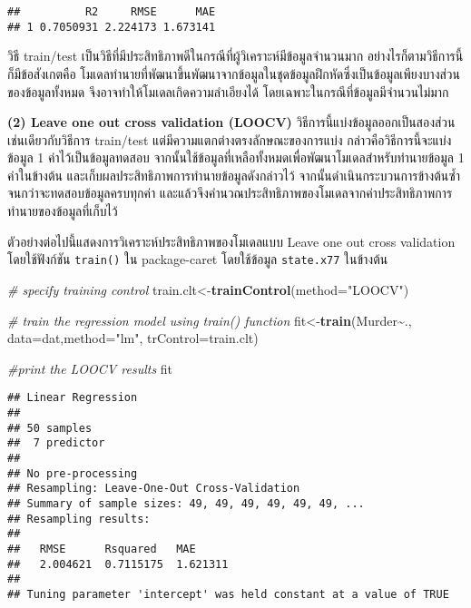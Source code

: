 \documentclass[
]{article}
\newenvironment{Shaded}{\begin{snugshade}}{\end{snugshade}}
\newcommand{\CommentTok}[1]{\textcolor[rgb]{0.56,0.35,0.01}{\textit{#1}}}
\newcommand{\DataTypeTok}[1]{\textcolor[rgb]{0.13,0.29,0.53}{#1}}
\newcommand{\KeywordTok}[1]{\textcolor[rgb]{0.13,0.29,0.53}{\textbf{#1}}}
\newcommand{\NormalTok}[1]{#1}
\newcommand{\OperatorTok}[1]{\textcolor[rgb]{0.81,0.36,0.00}{\textbf{#1}}}
\newcommand{\StringTok}[1]{\textcolor[rgb]{0.31,0.60,0.02}{#1}}
\begin{document}
\begin{verbatim}
##          R2     RMSE      MAE
## 1 0.7050931 2.224173 1.673141
\end{verbatim}

วิธี train/test
เป็นวิธีที่มีประสิทธิภาพดีในกรณีที่ผู้วิเคราะห์มีข้อมูลจำนวนมาก
อย่างไรก็ตามวิธีการนี้ก็มีข้อสังเกตคือ
โมเดลทำนายที่พัฒนาขึ้นพัฒนาจากข้อมูลในชุดข้อมูลฝึกหัดซึ่งเป็นข้อมูลเพียงบางส่วนของข้อมูลทั้งหมด
จึงอาจทำให้โมเดลเกิดความลำเอียงได้ โดยเฉพาะในกรณีที่ข้อมูลมีจำนวนไม่มาก

\textbf{(2) Leave one out cross validation (LOOCV)}
วิธีการนี้แบ่งข้อมูลออกเป็นสองส่วนเช่นเดียวกับวิธีการ train/test
แต่มีความแตกต่างตรงลักษณะของการแบ่ง กล่าวคือวิธีการนี้จะแบ่งข้อมูล 1
ค่าไว้เป็นข้อมูลทดสอบ
จากนั้นใช้ข้อมูลที่เหลือทั้งหมดเพื่อพัฒนาโมเดลสำหรับทำนายข้อมูล 1
ค่าในข้างต้น และเก็บผลประสิทธิภาพการทำนายข้อมูลดังกล่าวไว้
จากนั้นดำเนินกระบวนการข้างต้นซ้ำจนกว่าจะทดสอบข้อมูลครบทุกค่า
และแล้วจึงคำนวณประสิทธิภาพของโมเดลจากค่าประสิทธิภาพการทำนายของข้อมูลที่เก็บไว้

ตัวอย่างต่อไปนี้แสดงการวิเคราะห์ประสิทธิภาพของโมเดลแบบ Leave one out
cross validation โดยใช้ฟังก์ชัน \texttt{train()} ใน package-caret
โดยใช้ข้อมูล \texttt{state.x77} ในข้างต้น

\begin{Shaded}
\begin{Highlighting}[]
\CommentTok{\# specify training control}
\NormalTok{train.clt\textless{}{-}}\KeywordTok{trainControl}\NormalTok{(}\DataTypeTok{method=}\StringTok{"LOOCV"}\NormalTok{)}

\CommentTok{\# train the regression model using train() function}
\NormalTok{fit\textless{}{-}}\KeywordTok{train}\NormalTok{(Murder}\OperatorTok{\textasciitilde{}}\NormalTok{., }\DataTypeTok{data=}\NormalTok{dat,}\DataTypeTok{method=}\StringTok{"lm"}\NormalTok{, }\DataTypeTok{trControl=}\NormalTok{train.clt)}

\CommentTok{\#print the LOOCV results}
\NormalTok{fit}
\end{Highlighting}
\end{Shaded}

\begin{verbatim}
## Linear Regression 
## 
## 50 samples
##  7 predictor
## 
## No pre-processing
## Resampling: Leave-One-Out Cross-Validation 
## Summary of sample sizes: 49, 49, 49, 49, 49, 49, ... 
## Resampling results:
## 
##   RMSE      Rsquared   MAE     
##   2.004621  0.7115175  1.621311
## 
## Tuning parameter 'intercept' was held constant at a value of TRUE
\end{verbatim}
\end{document}
